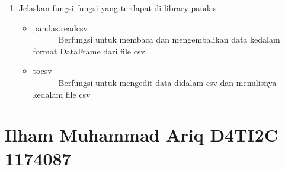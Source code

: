 \begin{enumerate}
\begin{itemize}
\item csv.writer\\
	\verb|		|Berfungsi untuk menuliskan data dari variable kedalam file csv. Fungsi writer akan membuat objek yang cocok untuk menulis. Untuk mengulang data yang ada di atas baris, gunakan fungsi writerow.

	
\item csv.register\textunderscore dialect untuk Mendaftarkan dialect pada csv
\item csv.unregister\textunderscore dialect untuk Menghapus dialect yang diasosiasi dengan nama dari registry dialect
\item csv.list\textunderscore dialects untuk Mengembalikan dialect yang diasosiasi dengan nama
\item csv.field\textunderscore size\textunderscore limit Mengembalikan ukuran field maksimum yang diizinkan oleh parser.
\item csv.DictReader\\
	\verb|		|Berfungsi untuk membaca dan mengembalikan data kedalam variable dictionary dari file csv.

\end{itemize}

\item Jelaskan fungsi-fungsi yang terdapat di library pandas\\
\begin{itemize}
	\item pandas.read\textunderscore csv\\
\verb|		|Berfungsi untuk membaca dan mengembalikan data kedalam format DataFrame dari file csv.

	\item to\textunderscore csv\\
\verb|		|Berfungsi untuk mengedit data didalam csv dan menulisnya kedalam file csv


\end{itemize}

\end{enumerate}


\section{Ilham Muhammad Ariq D4TI2C 1174087}

